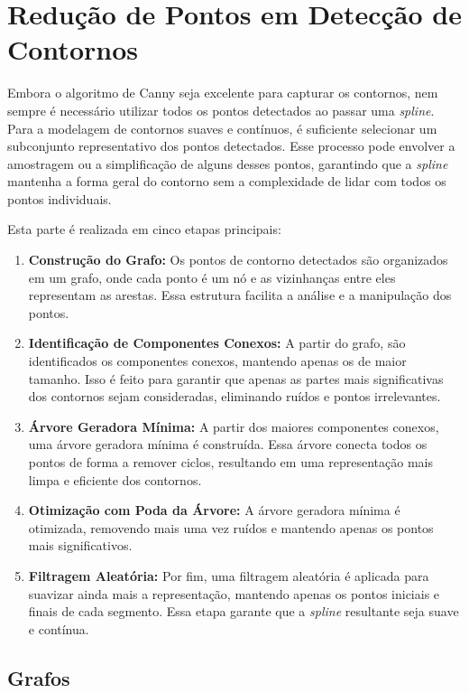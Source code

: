 \newpage

\section{Redução de Pontos em Detecção de Contornos}
\label{sec:reduzindo-pontos-deteccao-contornos}


Embora o algoritmo de Canny seja excelente para capturar os contornos, nem sempre é necessário utilizar todos os pontos detectados ao passar uma \textit{spline}. Para a modelagem de contornos suaves e contínuos, é suficiente selecionar um subconjunto representativo dos pontos detectados. Esse processo pode envolver a amostragem ou a simplificação de alguns desses pontos, garantindo que a \textit{spline} mantenha a forma geral do contorno sem a complexidade de lidar com todos os pontos individuais.

Esta parte é realizada em cinco etapas principais:
\begin{enumerate}
    \item \textbf{Construção do Grafo:} Os pontos de contorno detectados são organizados em um grafo, onde cada ponto é um nó e as vizinhanças entre eles representam as arestas. Essa estrutura facilita a análise e a manipulação dos pontos.
    \item \textbf{Identificação de Componentes Conexos:} A partir do grafo, são identificados os componentes conexos, mantendo apenas os de maior tamanho. Isso é feito para garantir que apenas as partes mais significativas dos contornos sejam consideradas, eliminando ruídos e pontos irrelevantes.
    \item \textbf{Árvore Geradora Mínima:} A partir dos maiores componentes conexos, uma árvore geradora mínima é construída. Essa árvore conecta todos os pontos de forma a remover ciclos, resultando em uma representação mais limpa e eficiente dos contornos.
    \item \textbf{Otimização com Poda da Árvore:} A árvore geradora mínima é otimizada, removendo mais uma vez ruídos e mantendo apenas os pontos mais significativos.
    \item \textbf{Filtragem Aleatória:} Por fim, uma filtragem aleatória é aplicada para suavizar ainda mais a representação, mantendo apenas os pontos iniciais e finais de cada segmento. Essa etapa garante que a \textit{spline} resultante seja suave e contínua.
\end{enumerate}

\subsection{Grafos}

